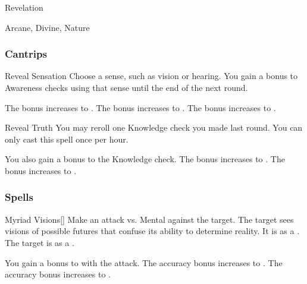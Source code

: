 \newpage
\begin{spellsection}{Revelation}

\begin{spellheader}
\end{spellheader}


 Arcane, Divine, Nature

\subsubsection{Cantrips}


\begin{freeability}{Reveal Sensation}
Choose a sense, such as vision or hearing.
You gain a  bonus to Awareness checks using that sense until the end of the next round.

\rankline
{} The bonus increases to .
 The bonus increases to .
 The bonus increases to .
\end{freeability}


\begin{freeability}{Reveal Truth}
You may reroll one Knowledge check you made last round.
You can only cast this spell once per hour.

\rankline
{} You also gain a  bonus to the Knowledge check.
 The bonus increases to .
 The bonus increases to .
\end{freeability}

\end{spellsection}


\subsubsection{Spells}


\lowercase{\hypertarget{spell:Myriad Visions}{}}\label{spell:Myriad Visions}
\begin{freeability}[Rank 1]{\hypertarget{spell:Myriad Visions}{Myriad Visions}}[]
Make an attack vs. Mental against the target.
\hit The target sees visions of possible futures that confuse its ability to determine reality.
It is  as a .
\crit The target is  as a .

\rankline
{} You gain a  bonus to  with the attack.
 The accuracy bonus increases to .
 The accuracy bonus increases to .

\end{freeability}
\vspace{0.25em}



